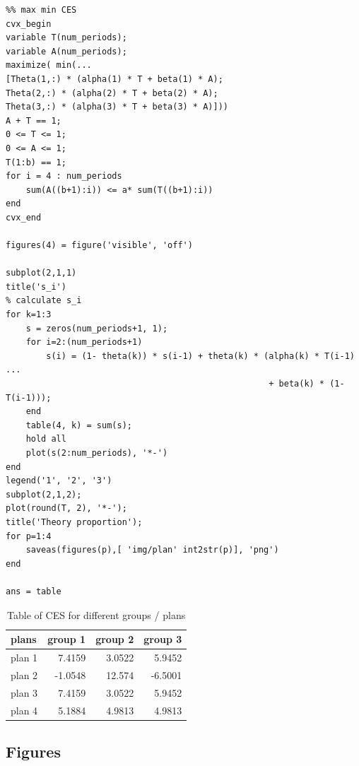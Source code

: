 \documentclass[11pt]{article}
\begin{document}
\begin{verbatim}
%% max min CES
cvx_begin
variable T(num_periods);
variable A(num_periods);
maximize( min(...
[Theta(1,:) * (alpha(1) * T + beta(1) * A);
Theta(2,:) * (alpha(2) * T + beta(2) * A);
Theta(3,:) * (alpha(3) * T + beta(3) * A)]))
A + T == 1;
0 <= T <= 1;
0 <= A <= 1;
T(1:b) == 1;
for i = 4 : num_periods
    sum(A((b+1):i)) <= a* sum(T((b+1):i))
end
cvx_end

figures(4) = figure('visible', 'off')

subplot(2,1,1)
title('s_i')
% calculate s_i
for k=1:3
    s = zeros(num_periods+1, 1);
    for i=2:(num_periods+1)
        s(i) = (1- theta(k)) * s(i-1) + theta(k) * (alpha(k) * T(i-1) ...
                                                    + beta(k) * (1-T(i-1)));
    end
    table(4, k) = sum(s);
    hold all
    plot(s(2:num_periods), '*-')
end
legend('1', '2', '3')
subplot(2,1,2);
plot(round(T, 2), '*-');
title('Theory proportion');
for p=1:4
    saveas(figures(p),[ 'img/plan' int2str(p)], 'png')
end

ans = table
\end{verbatim}


\begin{org}
\begin{table}[htb]
\caption{Table of CES for different groups / plans}
\centering
\begin{tabular}{lrrr}
plans & group 1 & group 2 & group 3\\
\hline
plan 1 & 7.4159 & 3.0522 & 5.9452\\
plan 2 & -1.0548 & 12.574 & -6.5001\\
plan 3 & 7.4159 & 3.0522 & 5.9452\\
plan 4 & 5.1884 & 4.9813 & 4.9813\\
\end{tabular}
\end{table}
\end{org}



\subsection{Figures}
\label{sec:orgheadline2}
\end{document}
